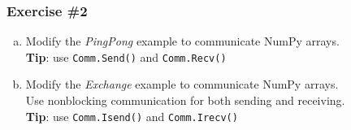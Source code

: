 \begin{frame}
  \frametitle{Exercise \#2}
  \begin{enumerate}[a)]
  \item Modify the \emph{PingPong} example to communicate NumPy arrays.\\
    \textbf{Tip}: use \texttt{Comm.Send()} and \texttt{Comm.Recv()}
  \item Modify the \emph{Exchange} example to communicate NumPy arrays.\\
    Use nonblocking communication for both sending and receiving.\\
    \textbf{Tip}: use \texttt{Comm.Isend()} and \texttt{Comm.Irecv()}
  \end{enumerate}
\end{frame}

